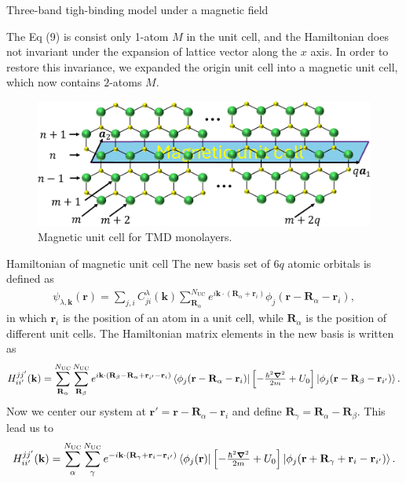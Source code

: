 \documentclass[aspectratio=169,compress,x11names]{beamer}
\begin{document}
	\begin{frame}{Three-band tigh-binding model under a magnetic field}
		\begin{multicols}{2}
			The Eq (9) is consist only 1-atom $M$ in the unit cell, and the Hamiltonian does not invariant under the expansion of lattice vector along the $x$ axis. In order to restore this invariance, we expanded the origin unit cell into a magnetic unit cell, which now contains $2$-atoms $M$.
			\columnbreak
			\begin{figure}
				\centering
				\includegraphics[width=\linewidth]{../pic/magneticUC_cut.pdf}
				\caption{\label{fig:Mag UC} Magnetic unit cell for TMD monolayers.}
			\end{figure}
		\end{multicols}
	\end{frame}
	\begin{frame}{Hamiltonian of magnetic unit cell}
		The new basis set of $6q$ atomic orbitals is defined as
		\begin{gather}
			\psi_{\lambda,\mathbf{k}}(\mathbf{r}) = \sum_{j,i} C_{ji}^{\lambda}(\mathbf{k}) \sum_{\mathbf{R}_{\alpha}}^{N_{\text{UC}}} e^{i\mathbf{k}\cdot(\mathbf{R}_{\alpha} + \mathbf{r}_{i})} \phi_{j}(\mathbf{r} - \mathbf{R}_{\alpha} - \mathbf{r}_{i}),
		\end{gather}
		in which $\mathbf{r}_{i}$ is the position of an atom in a unit cell, while $\mathbf{R}_{\alpha}$ is the position of different unit cells.
		The Hamiltonian matrix elements in the new basis is written as
		\begin{gather}
			H_{ii'}^{jj'}(\mathbf{k})
			= \sum_{\mathbf{R}_{\alpha}}^{N_\text{UC}}\sum_{\mathbf{R}_{\beta}}^{N_\text{UC}} e^{i \mathbf{k} \cdot (\mathbf{R}_{\beta} - \mathbf{R}_{\alpha} + \mathbf{r}_{i'} - \mathbf{r}_{i})}  \bra{\phi_{j}(\mathbf{r} - \mathbf{R}_{\alpha} - \mathbf{r}_{i})} \left[-\tfrac{\hbar^{2} \boldsymbol{\nabla}^{2}}{2m} + U_{0}\right] \ket{\phi_{j}(\mathbf{r} - \mathbf{R}_{\beta} - \mathbf{r}_{i'})}.
		\end{gather}
		Now we center our system at $\mathbf{r}'=\mathbf{r} - \mathbf{R}_{\alpha} - \mathbf{r}_{i}$ and define $\mathbf{R}_{\gamma} = \mathbf{R}_{\alpha} - \mathbf{R}_{\beta}$. This lead us to
		\begin{gather}
			H_{ii'}^{jj'}(\mathbf{k})
			= \sum_{{\alpha}}^{N_\text{UC}}\sum_{{\gamma}}^{N_\text{UC}} e^{-i \mathbf{k} \cdot (\mathbf{R}_{\gamma} + \mathbf{r}_{i} - \mathbf{r}_{i'})}  \bra{\phi_{j}(\mathbf{r})} \left[-\tfrac{\hbar^{2} \boldsymbol{\nabla}^{2}}{2m} + U_{0}\right] \ket{\phi_{j}(\mathbf{r} + \mathbf{R}_{\gamma} + \mathbf{r}_{i} - \mathbf{r}_{i'})}.
		\end{gather}
	\end{frame}
\end{document}
